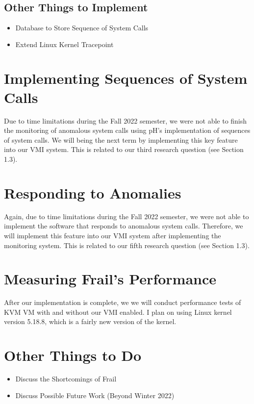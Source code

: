 \documentclass{report}
\begin{document}
\begin{spacing}{1.5}
\subsection{Other Things to Implement}

{\large
\begin{itemize}
    \item Database to Store Sequence of System Calls
    \item Extend Linux Kernel Tracepoint
\end{itemize}
}

\section{Implementing Sequences of System Calls}

{\large
Due to time limitations during the Fall 2022 semester, we were not able to finish the monitoring of anomalous system calls using pH's implementation of sequences of system calls. We will being the next term by implementing this key feature into our VMI system. This is related to our third research question (see Section 1.3).
\newline
}

\section{Responding to Anomalies}
Again, due to time limitations during the Fall 2022 semester, we were not able to implement the software that responds to anomalous system calls. Therefore, we will implement this feature into our VMI system after implementing the monitoring system. This is related to our fifth research question (see Section 1.3).


\section{Measuring Frail's Performance}

After our implementation is complete, we we will conduct performance tests of KVM VM with and without our VMI enabled. I plan on using Linux kernel version 5.18.8, which is a fairly new version of the kernel.


\section{Other Things to Do}

{\large
\begin{itemize}
    \item Discuss the Shortcomings of Frail
    \item Discuss Possible Future Work (Beyond Winter 2022)
\end{itemize}
}



{\large


}


\end{spacing}
\end{document}
